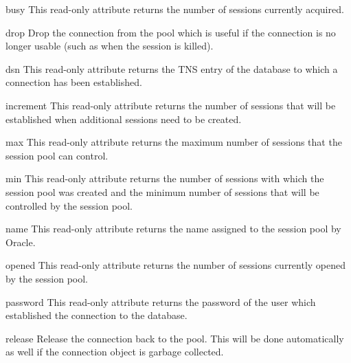 \documentclass{manual}
\begin{document}
\begin{datadesc}{busy}
  This read-only attribute returns the number of sessions currently acquired.
\end{datadesc}

\begin{funcdesc}{drop}{}
  Drop the connection from the pool which is useful if the connection is no
  longer usable (such as when the session is killed).
\end{funcdesc}

\begin{datadesc}{dsn}
  This read-only attribute returns the TNS entry of the database to which a
  connection has been established.
\end{datadesc}

\begin{datadesc}{increment}
  This read-only attribute returns the number of sessions that will be
  established when additional sessions need to be created.
\end{datadesc}

\begin{datadesc}{max}
  This read-only attribute returns the maximum number of sessions that the
  session pool can control.
\end{datadesc}

\begin{datadesc}{min}
  This read-only attribute returns the number of sessions with which the
  session pool was created and the minimum number of sessions that will be
  controlled by the session pool.
\end{datadesc}

\begin{datadesc}{name}
  This read-only attribute returns the name assigned to the session pool by
  Oracle.
\end{datadesc}

\begin{datadesc}{opened}
  This read-only attribute returns the number of sessions currently opened by
  the session pool.
\end{datadesc}

\begin{datadesc}{password}
  This read-only attribute returns the password of the user which established
  the connection to the database.
\end{datadesc}

\begin{funcdesc}{release}{}
  Release the connection back to the pool. This will be done automatically as
  well if the connection object is garbage collected.
\end{funcdesc}
\end{document}
